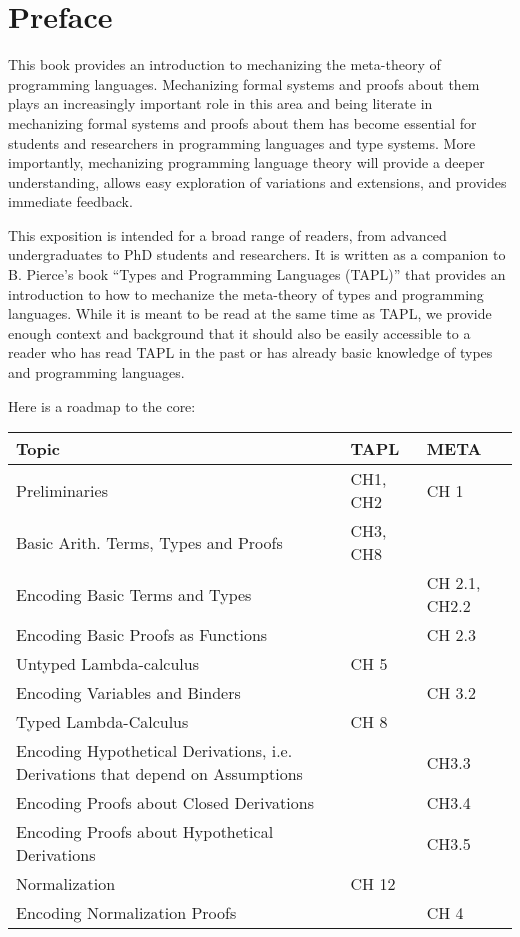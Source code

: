 \chapter*{Preface}
This book provides an introduction to mechanizing the meta-theory of programming languages. Mechanizing formal systems and proofs about them plays an increasingly important role in this area and being literate in mechanizing formal systems and proofs about them  has become essential for students and researchers in programming languages and type systems. More importantly, mechanizing programming language theory will provide a deeper understanding, allows easy  exploration of variations and extensions, and provides immediate feedback.

This exposition is intended for a broad range of readers, from advanced undergraduates to PhD students and researchers.  It is written as a companion to B. Pierce's book ``Types and Programming Languages (TAPL)'' that provides an introduction to how to mechanize the meta-theory of types and programming languages. While it is meant to be read  at the same time as TAPL, we provide enough context and background that it should also be easily accessible to a reader who has read TAPL in the past or has already basic knowledge of types and programming languages. 

Here is a roadmap to the core:

\begin{center}
\begin{tabular}{p{9cm}|p{2.5cm}|p{3cm}}
 Topic & TAPL & META \\
\hline  
Preliminaries & CH1, CH2 & CH 1\\
Basic Arith. Terms, Types and Proofs & CH3, CH8 &  \\
\hline  
Encoding Basic Terms and Types & & CH 2.1, CH2.2 \\
Encoding Basic Proofs as Functions & & CH 2.3 \\
\hline  
Untyped Lambda-calculus & CH 5  & \\
Encoding Variables and Binders & & CH 3.2 \\
\hline  
Typed Lambda-Calculus & CH 8  & \\
Encoding Hypothetical Derivations, i.e. Derivations that depend on Assumptions & & CH3.3\\
Encoding Proofs about Closed Derivations & & CH3.4 \\
Encoding Proofs about Hypothetical Derivations & & CH3.5 \\
\hline
Normalization & CH 12 & \\
Encoding Normalization Proofs & & CH 4 \\
\end{tabular}
\end{center}

